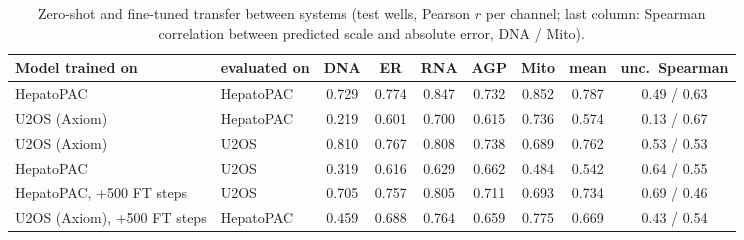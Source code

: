 \documentclass[11pt,a4paper]{article}
\begin{document}
\begin{table}[H]
\centering\small
\caption{Zero-shot and fine-tuned transfer between systems (test wells, Pearson $r$ per channel; last column: Spearman correlation between predicted scale and absolute error, DNA / Mito).}
\label{tab:transfer}
\begin{tabular}{llccccccc}
\toprule
Model trained on & evaluated on & DNA & ER & RNA & AGP & Mito & mean & unc.\ Spearman \\
\midrule
HepatoPAC & HepatoPAC & 0.729 & 0.774 & 0.847 & 0.732 & 0.852 & 0.787 & 0.49 / 0.63 \\
U2OS (Axiom) & HepatoPAC & 0.219 & 0.601 & 0.700 & 0.615 & 0.736 & 0.574 & 0.13 / 0.67 \\
U2OS (Axiom) & U2OS & 0.810 & 0.767 & 0.808 & 0.738 & 0.689 & 0.762 & 0.53 / 0.53 \\
HepatoPAC & U2OS & 0.319 & 0.616 & 0.629 & 0.662 & 0.484 & 0.542 & 0.64 / 0.55 \\
\midrule
HepatoPAC, +500 FT steps & U2OS & 0.705 & 0.757 & 0.805 & 0.711 & 0.693 & 0.734 & 0.69 / 0.46 \\
U2OS (Axiom), +500 FT steps & HepatoPAC & 0.459 & 0.688 & 0.764 & 0.659 & 0.775 & 0.669 & 0.43 / 0.54 \\
\bottomrule
\end{tabular}
\end{table}
\end{document}
